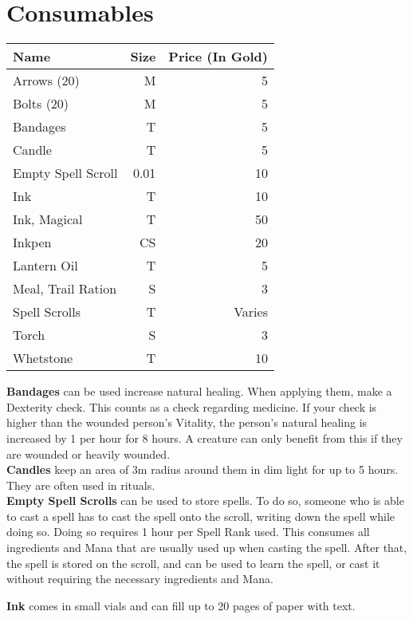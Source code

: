 \section{Consumables}\label{sec:consumables}
\begin{longtable}{l | r | r}
	Name & Size & Price (In Gold)\\ \hline
	Arrows (20) & M & 5\\
	Bolts (20) & M & 5\\
	Bandages & T & 5\\
	Candle & T & 5\\
	Empty Spell Scroll & 0.01 & 10\\
	Ink & T & 10\\
	Ink, Magical & T & 50\\
	Inkpen & CS & 20\\
	Lantern Oil & T & 5\\
	Meal, Trail Ration & S & 3\\
	Spell Scrolls & T & Varies\\
	Torch & S & 3\\
	Whetstone & T & 10\\
\end{longtable}


\textbf{Bandages} can be used increase natural healing.
When applying them, make a Dexterity check.
This counts as a check regarding medicine.
If your check is higher than the wounded person's Vitality, the person's natural healing is increased by 1 per hour for 8 hours.
A creature can only benefit from this if they are wounded or heavily wounded.\\

\textbf{Candles} keep an area of 3m radius around them in dim light for up to 5 hours.
They are often used in rituals.\\

\textbf{Empty Spell Scrolls} can be used to store spells.
To do so, someone who is able to cast a spell has to cast the spell onto the scroll, writing down the spell while doing so.
Doing so requires 1 hour per Spell Rank used.
This consumes all ingredients and Mana that are usually used up when casting the spell.
After that, the spell is stored on the scroll, and can be used to learn the spell, or cast it without requiring the necessary ingredients and Mana.

\textbf{Ink} comes in small vials and can fill up to 20 pages of paper with text.\\

